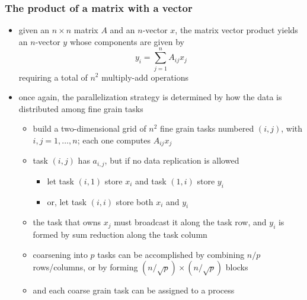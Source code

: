 \begin{frame}[fragile]
%
  \frametitle{The product of a matrix with a vector}
%
  \begin{itemize}
%
  \item given an $n \times n$ matrix $A$ and an $n$-vector $x$, the matrix vector product
    yields an $n$-vector $y$ whose components are given by
    \begin{equation*}
      y_{i} = \sum_{j=1}^{n} A_{ij} x_{j}
    \end{equation*}
    requiring a total of $n^{2}$ multiply-add operations
%
  \item once again, the parallelization strategy is determined by how the data is distributed
    among fine grain tasks
    \begin{itemize}
    \item build a two-dimensional grid of $n^{2}$ fine grain tasks numbered $(i,j)$, with $i,j
      = 1, \ldots, n$; each one computes $A_{ij}x_{j}$
    \item task $(i,j)$ has $a_{i,j}$, but if no data replication is allowed
      \begin{itemize}
      \item let task $(i,1)$ store $x_{i}$ and task $(1,i)$ store $y_{i}$
      \item or, let task $(i,i)$ store both $x_{i}$ and $y_{i}$
      \end{itemize}
    \item the task that owns $x_{j}$ must broadcast it along the  task row, and $y_{i}$
      is formed by sum reduction along the  task column
    \item coarsening into $p$ tasks can be accomplished by combining $n/p$ rows/columns, or by
      forming $(n/\sqrt{p}) \times (n/\sqrt{p})$ blocks
    \item and each coarse grain task can be assigned to a process
    \end{itemize}
%
  \end{itemize}
%
\end{frame}


